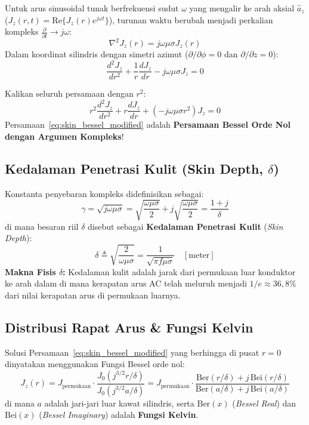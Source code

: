 \documentclass[11pt,a4paper]{article}
\theoremstyle{definition}
\begin{document}
Untuk arus sinusoidal tunak berfrekuensi sudut $\omega$ yang mengalir ke arah aksial $\hat{a}_z$ ($J_z(r, t) = \text{Re}\{J_z(r) e^{j\omega t}\}$), turunan waktu berubah menjadi perkalian kompleks $\frac{\partial}{\partial t} \to j\omega$:
\begin{equation}
    \nabla^2 J_z(r) = j\omega\mu\sigma J_z(r)
\end{equation}
Dalam koordinat silindris dengan simetri azimut ($\partial/\partial\phi = 0$ dan $\partial/\partial z = 0$):
\begin{equation}
    \frac{d^2 J_z}{dr^2} + \frac{1}{r} \frac{dJ_z}{dr} - j\omega\mu\sigma J_z = 0
    \label{eq:skin_effect_ode}
\end{equation}

Kalikan seluruh persamaan dengan $r^2$:
\begin{equation}
    r^2 \frac{d^2 J_z}{dr^2} + r \frac{dJ_z}{dr} + \left( -j\omega\mu\sigma r^2 \right) J_z = 0
    \label{eq:skin_bessel_modified}
\end{equation}
Persamaan~\eqref{eq:skin_bessel_modified} adalah \textbf{Persamaan Bessel Orde Nol dengan Argumen Kompleks}!

\subsection{Kedalaman Penetrasi Kulit (Skin Depth, \texorpdfstring{$\delta$}{delta})}
Konstanta penyebaran kompleks didefinisikan sebagai:
\begin{equation}
    \gamma = \sqrt{j\omega\mu\sigma} = \sqrt{\frac{\omega\mu\sigma}{2}} + j\sqrt{\frac{\omega\mu\sigma}{2}} = \frac{1 + j}{\delta}
\end{equation}
di mana besaran riil $\delta$ disebut sebagai \textbf{Kedalaman Penetrasi Kulit} (\textit{Skin Depth}):
\begin{equation}
    \delta \triangleq \sqrt{\frac{2}{\omega\mu\sigma}} = \frac{1}{\sqrt{\pi f \mu \sigma}}\quad [\text{meter}]
    \label{eq:skin_depth_formula}
\end{equation}
\textbf{Makna Fisis $\delta$:} Kedalaman kulit adalah jarak dari permukaan luar konduktor ke arah dalam di mana kerapatan arus AC telah meluruh menjadi $1/e \approx 36{,}8\%$ dari nilai kerapatan arus di permukaan luarnya.

\subsection{Distribusi Rapat Arus \& Fungsi Kelvin}
Solusi Persamaan~\eqref{eq:skin_bessel_modified} yang berhingga di pusat $r = 0$ dinyatakan menggunakan Fungsi Bessel orde nol:
\begin{equation}
    J_z(r) = J_{\text{permukaan}} \cdot \frac{J_0(j^{3/2} r / \delta)}{J_0(j^{3/2} a / \delta)} = J_{\text{permukaan}} \cdot \frac{\text{Ber}(r/\delta) + j\,\text{Bei}(r/\delta)}{\text{Ber}(a/\delta) + j\,\text{Bei}(a/\delta)}
    \label{eq:kelvin_current_distribution}
\end{equation}
di mana $a$ adalah jari-jari luar kawat silindris, serta $\text{Ber}(x)$ (\textit{Bessel Real}) dan $\text{Bei}(x)$ (\textit{Bessel Imaginary}) adalah \textbf{Fungsi Kelvin}.
\end{document}

